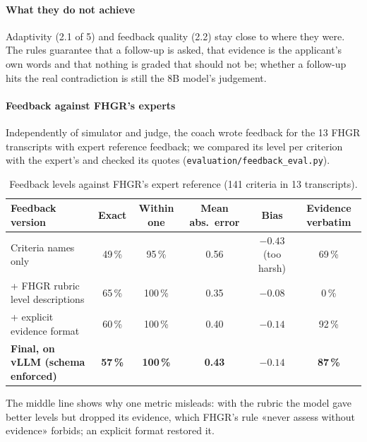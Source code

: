 \documentclass[10pt,a4paper]{article}
\begin{document}
\paragraph{What they do not achieve} Adaptivity (2.1 of 5) and feedback quality (2.2) stay close to where they were. The rules guarantee that a
follow-up is asked, that evidence is the applicant's own words and that nothing is graded that should not be; whether a
follow-up hits the real contradiction is still the 8B model's judgement.

\paragraph{Feedback against FHGR's experts} Independently of simulator and judge, the coach wrote feedback for the 13 FHGR transcripts with
expert reference feedback; we compared its level per criterion with the expert's and checked its quotes (\texttt{evaluation/feedback\_eval.py}).

\begin{table}[h]
\centering\small
\caption{Feedback levels against FHGR's expert reference (141 criteria in 13 transcripts).}
\label{tab:experts}
\begin{tabularx}{\textwidth}{@{}Xccccc@{}}
\toprule
\sffamily\bfseries Feedback version & \sffamily\bfseries Exact & \sffamily\bfseries Within one & \sffamily\bfseries Mean abs.\ error & \sffamily\bfseries Bias & \sffamily\bfseries Evidence verbatim \\
\midrule
Criteria names only & 49\,\% & 95\,\% & 0.56 & $-0.43$ (too harsh) & 69\,\% \\
+ FHGR rubric level descriptions & 65\,\% & 100\,\% & 0.35 & $-0.08$ & 0\,\% \\
+ explicit evidence format & 60\,\% & 100\,\% & 0.40 & $-0.14$ & 92\,\% \\
\textbf{Final, on vLLM (schema enforced)} & \textbf{57\,\%} & \textbf{100\,\%} & \textbf{0.43} & $\mathbf{-0.14}$ & \textbf{87\,\%} \\
\bottomrule
\end{tabularx}
\end{table}
The middle line shows why one metric misleads: with the rubric the model gave better levels but dropped its evidence, which
FHGR's rule «never assess without evidence» forbids; an explicit format restored it.
\end{document}
